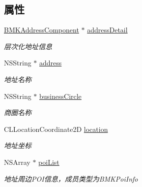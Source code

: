 \subsection*{属性}
\begin{DoxyCompactItemize}
\item 
\hypertarget{interface_b_m_k_reverse_geo_code_result_acde5aee09b57f17a58b7f557e3ad4758}{}\hyperlink{interface_b_m_k_address_component}{B\+M\+K\+Address\+Component} $\ast$ \hyperlink{interface_b_m_k_reverse_geo_code_result_acde5aee09b57f17a58b7f557e3ad4758}{address\+Detail}\label{interface_b_m_k_reverse_geo_code_result_acde5aee09b57f17a58b7f557e3ad4758}

\begin{DoxyCompactList}\small\item\em 层次化地址信息 \end{DoxyCompactList}\item 
\hypertarget{interface_b_m_k_reverse_geo_code_result_a069818e5afe4ee4041d7484d70e1e3bb}{}N\+S\+String $\ast$ \hyperlink{interface_b_m_k_reverse_geo_code_result_a069818e5afe4ee4041d7484d70e1e3bb}{address}\label{interface_b_m_k_reverse_geo_code_result_a069818e5afe4ee4041d7484d70e1e3bb}

\begin{DoxyCompactList}\small\item\em 地址名称 \end{DoxyCompactList}\item 
\hypertarget{interface_b_m_k_reverse_geo_code_result_a89a6c5c818c6dcbfb891744e58e3a7c2}{}N\+S\+String $\ast$ \hyperlink{interface_b_m_k_reverse_geo_code_result_a89a6c5c818c6dcbfb891744e58e3a7c2}{business\+Circle}\label{interface_b_m_k_reverse_geo_code_result_a89a6c5c818c6dcbfb891744e58e3a7c2}

\begin{DoxyCompactList}\small\item\em 商圈名称 \end{DoxyCompactList}\item 
\hypertarget{interface_b_m_k_reverse_geo_code_result_ae7afa6e87f1c8fc31a17dbccf15588da}{}C\+L\+Location\+Coordinate2\+D \hyperlink{interface_b_m_k_reverse_geo_code_result_ae7afa6e87f1c8fc31a17dbccf15588da}{location}\label{interface_b_m_k_reverse_geo_code_result_ae7afa6e87f1c8fc31a17dbccf15588da}

\begin{DoxyCompactList}\small\item\em 地址坐标 \end{DoxyCompactList}\item 
\hypertarget{interface_b_m_k_reverse_geo_code_result_a6c9fd2997504cff3b99569f5f89dba20}{}N\+S\+Array $\ast$ \hyperlink{interface_b_m_k_reverse_geo_code_result_a6c9fd2997504cff3b99569f5f89dba20}{poi\+List}\label{interface_b_m_k_reverse_geo_code_result_a6c9fd2997504cff3b99569f5f89dba20}

\begin{DoxyCompactList}\small\item\em 地址周边\+P\+O\+I信息，成员类型为\+B\+M\+K\+Poi\+Info \end{DoxyCompactList}\end{DoxyCompactItemize}


